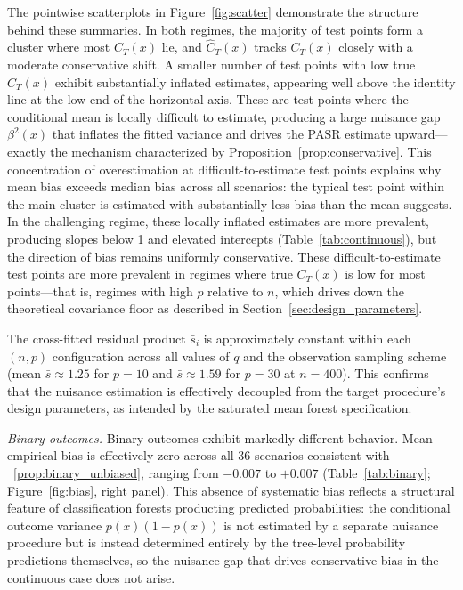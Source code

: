 \documentclass[11pt]{article}
\theoremstyle{plain}
\theoremstyle{definition}
\theoremstyle{remark}
\begin{document}
The pointwise scatterplots in Figure~\ref{fig:scatter} demonstrate the structure behind these summaries. In both regimes, the majority of test points form a cluster where most $C_T(x)$ lie, and $\widehat C_T(x)$ tracks $C_T(x)$ closely with a moderate conservative shift. A smaller number of test points with low true $C_T(x)$ exhibit substantially inflated estimates, appearing well above the identity line at the low end of the horizontal axis. These are test points where the conditional mean is locally difficult to estimate, producing a large nuisance gap $\beta^2(x)$ that inflates the fitted variance and drives the PASR estimate upward---exactly the mechanism characterized by Proposition~\ref{prop:conservative}. This concentration of overestimation at difficult-to-estimate test points explains why mean bias exceeds median bias across all scenarios: the typical test point within the main cluster is estimated with substantially less bias than the mean suggests. In the challenging regime, these locally inflated estimates are more prevalent, producing slopes below 1 and elevated intercepts (Table~\ref{tab:continuous}), but the direction of bias remains uniformly conservative. These difficult-to-estimate test points are more prevalent in regimes where true $C_T(x)$ is low for most points---that is, regimes with high $p$ relative to $n$, which drives down the theoretical covariance floor as described in Section~\ref{sec:design_parameters}.

The cross-fitted residual product $\bar s_i$ is approximately constant within each $(n, p)$ configuration across all values of $q$ and the observation sampling scheme (mean $\bar s \approx 1.25$ for $p = 10$ and $\bar s \approx 1.59$ for $p = 30$ at $n = 400$). This confirms that the nuisance estimation is effectively decoupled from the target procedure's design parameters, as intended by the saturated mean forest specification.

\medskip
\noindent\textit{Binary outcomes.}\quad
Binary outcomes exhibit markedly different behavior. Mean empirical bias is effectively zero across all 36 scenarios consistent with ~\ref{prop:binary_unbiased}, ranging from $-0.007$ to $+0.007$ (Table~\ref{tab:binary}; Figure~\ref{fig:bias}, right panel). This absence of systematic bias reflects a structural feature of classification forests producting predicted probabilities: the conditional outcome variance $p(x)(1-p(x))$ is not estimated by a separate nuisance procedure but is instead determined entirely by the tree-level probability predictions themselves, so the nuisance gap that drives conservative bias in the continuous case does not arise.
\end{document}
